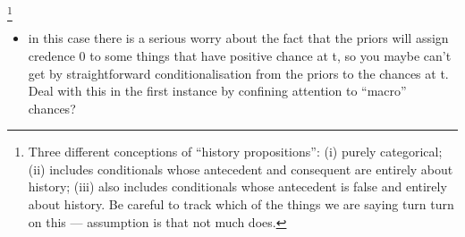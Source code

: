 \documentclass[If.tex]{subfiles}
\begin{document}
%

\footnote{Three different conceptions of “history propositions”: (i) purely categorical; (ii) includes conditionals whose antecedent and consequent are entirely about history; (iii) also includes conditionals whose antecedent is false and entirely about history.  Be careful to track which of the things we are saying turn turn on this --- assumption is that not much does.}

\begin{itemize}
\item
  in this case there is a serious worry about the fact that the priors
  will assign credence 0 to some things that have positive chance at t,
  so you maybe can't get by straightforward conditionalisation from the
  priors to the chances at t. Deal with this in the first instance by
  confining attention to “macro” chances?\\
\end{itemize}
\end{document}
